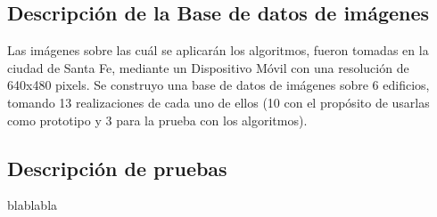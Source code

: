 \documentclass[conference,spanish,a4paper,10pt,oneside,final]{tfmpd}
\begin{document}
\subsection{Descripción de la Base de datos de imágenes}
Las imágenes sobre las cuál se aplicarán los algoritmos, fueron tomadas en la ciudad de Santa Fe, mediante un Dispositivo Móvil con una resolución de 640x480 pixels. Se construyo una base de datos de imágenes sobre 6 edificios, tomando 13 realizaciones de cada uno de ellos (10 con el propósito de usarlas como prototipo y 3 para la prueba con los algoritmos).
%
%
\subsection{Descripción de pruebas}
blablabla
%
%
%
%
%
\end{document}
